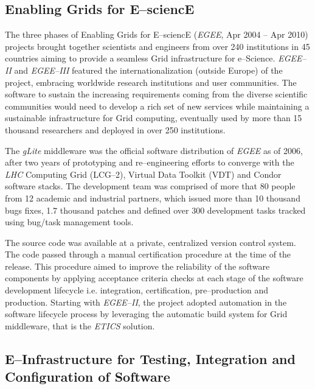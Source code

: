 \documentclass[journal]{IEEEtran}
\begin{document}
\subsection{Enabling Grids for E--sciencE}

The three phases of Enabling Grids for E--sciencE ({\sl EGEE}, Apr 2004 -- Apr 2010)
\cite{cordis:egee, cordis:egee2, cordis:egee3} projects brought together
scientists and engineers from over 240 institutions in 45 countries aiming to
provide a seamless Grid infrastructure for e--Science. {\sl EGEE--II} and {\sl EGEE--III}
featured the internationalization (outside Europe) of the project, embracing worldwide research
institutions and user communities. The software to sustain the increasing
requirements coming from the diverse scientific communities would need to develop a
rich set of new services while maintaining a sustainable infrastructure for
Grid computing, eventually used by more than 15 thousand researchers and deployed in
over 250 institutions.

The {\sl gLite} middleware \cite{glite} was the
official software distribution of {\sl EGEE} as of 2006, after two years of prototyping and
re--engineering efforts to converge with the {\sl LHC} Computing Grid (LCG--2), Virtual
Data Toolkit (VDT) and Condor \cite{condor} software stacks. The
development team was comprised of more that 80 people from 12 academic and
industrial partners, which issued more than 10 thousand bugs fixes, 1.7 thousand patches and
defined over 300 development tasks tracked using bug/task management tools.

The source code was available at a private, centralized version control system.
The code passed through a manual certification procedure at the time of the release.
This procedure aimed to improve the reliability of the software components by applying
acceptance criteria checks at each stage of the software development lifecycle
\cite{egee:acceptance-criteria} i.e. integration, certification, pre--production and
production. Starting with {\sl EGEE--II}, the project adopted automation in the software
lifecycle process by leveraging the automatic build system for Grid middleware, that is
the {\sl ETICS} \cite{etics} solution.

\subsection{E--Infrastructure for Testing, Integration and Configuration of Software}
\end{document}
